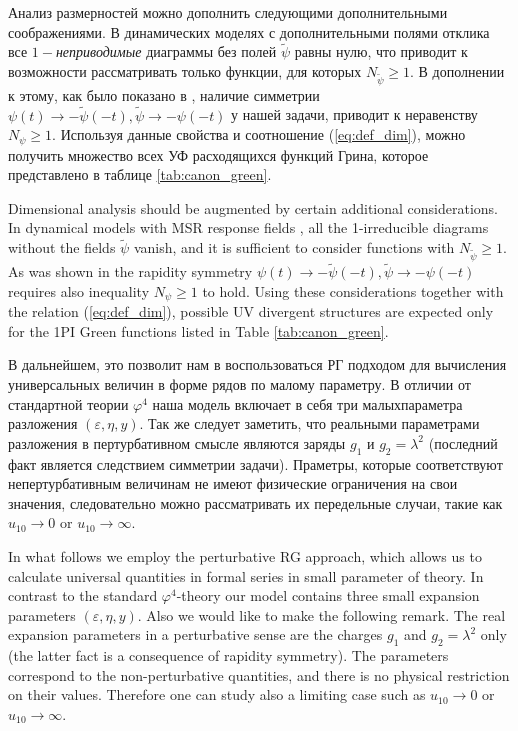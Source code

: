 \documentclass[12pt]{article}
\def\eps{\varepsilon}
\begin{document}
Анализ размерностей можно дополнить следующими дополнительными соображениями.
В динамических моделях с дополнительными полями отклика \cite{Tauber2014} все $1-${\it неприводимые} диаграммы без полей $\tilde{\psi}$ равны нулю, что приводит к возможности рассматривать только функции, для которых $N_{\tilde{\psi}} \ge 1$.
В дополнении к этому, как было показано в \cite{AntKap10}, наличие симметрии $\psi(t)\rightarrow -\tilde{\psi}(-t), \tilde{\psi}\rightarrow-\psi(-t)$ у нашей задачи, приводит к неравенству  $N_{\psi} \ge 1$.
Используя данные свойства и соотношение (\ref{eq:def_dim}), можно получить множество всех УФ расходящихся функций Грина, которое представлено в таблице \ref{tab:canon_green}.


Dimensional analysis should be augmented by certain additional considerations.
In dynamical models with MSR response fields \cite{Tauber2014}, all
the 1-irreducible diagrams without the
fields $\tilde{\psi}$ vanish, and it is sufficient to consider functions with 
$N_{\tilde{\psi}} \ge 1$. As was shown in \cite{AntKap10} the 
rapidity symmetry $\psi(t)\rightarrow -\tilde{\psi}(-t), \tilde{\psi}\rightarrow-\psi(-t)$
requires also inequality $N_{\psi} \ge 1$ to hold. Using these considerations
together with the relation (\ref{eq:def_dim}), possible UV divergent structures
are expected only for the 1PI Green functions listed in
Table \ref{tab:canon_green}.


В дальнейшем, это позволит нам в воспользоваться РГ подходом для вычисления универсальных величин в форме рядов по малому параметру.
В отличии от стандартной теории $\varphi^4$ наша модель включает в себя три малыхпараметра разложения $(\eps,\eta,y)$.
Так же следует заметить, что реальными параметрами разложения в пертурбативном смысле являются заряды $g_1$ и $g_2=\lambda^2$ (последний факт является следствием симметрии задачи).
Праметры, которые соответствуют непертурбативным величинам не имеют физические ограничения на свои значения, следовательно можно рассматривать их передельные случаи, такие как $u_{10} \rightarrow 0$ or $u_{10} \rightarrow \infty$.

	
In what follows we employ the perturbative RG approach, which allows us to 
calculate universal quantities in formal series in small parameter of theory.
In contrast to the standard $\varphi^4$-theory our model contains three
small expansion parameters $(\eps,\eta,y)$. Also we would like to make the 
following remark. The real expansion parameters in a perturbative sense
are the charges $g_1$ and $g_2=\lambda^2$ only (the latter fact is a consequence
of rapidity symmetry). The parameters correspond to
the non-perturbative quantities, and there is no physical restriction
on their values. Therefore one can study also a limiting case such as
$u_{10} \rightarrow 0$ or $u_{10} \rightarrow \infty$.
	
\end{document}
